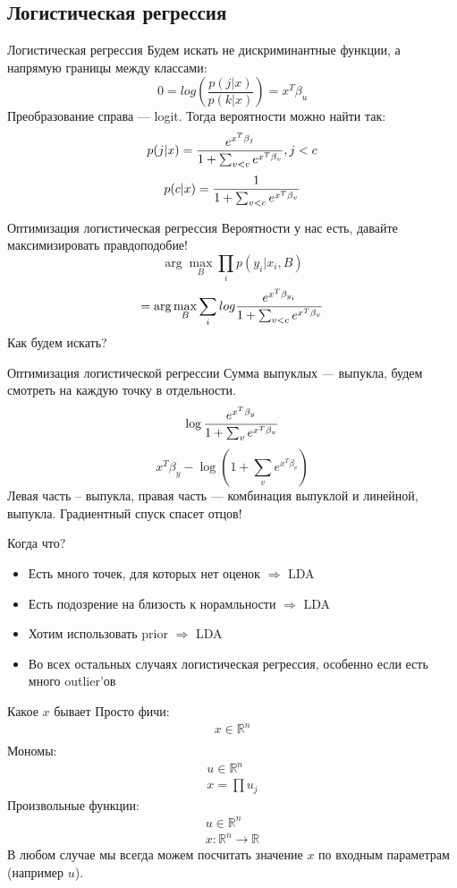 \documentclass[14pt, fleqn, xcolor={dvipsnames, table}]{beamer}
\begin{document}
\subsection{Логистическая регрессия}

\begin{frame}{Логистическая регрессия}
Будем искать не дискриминантные функции, а напрямую границы между классами:
$$
0 = log\left(\frac{p(j|x)}{p(k|x)}\right) = x^T \beta_{u}
$$
Преобразование справа --- logit. Тогда вероятности можно найти так:
$$
p(j|x) = {e^{x^T \beta_{j}} \over 1 + \sum_{v < c} e^{x^T\beta_v}}, j < c
$$
$$
p(c|x) = {1 \over 1 + \sum_{v < c} e^{x^T\beta_v}}
$$
\end{frame}

\begin{frame}{Оптимизация логистическая регрессия}
Вероятности у нас есть, давайте максимизировать правдоподобие!
$$
\arg \max_B \prod_i p(y_i|x_i, B)
$$
$$
= \arg \max_B \sum_i log {e^{x^T \beta_{y_i}} \over 1 + \sum_{v < c} e^{x^T\beta_v}}
$$
Как будем искать?
\end{frame}

\begin{frame}{Оптимизация логистической регрессии}
Сумма выпуклых --- выпукла, будем смотреть на каждую точку в отдельности.
$$
\log {e^{x^T\beta_y} \over 1 + \sum_{v} e^{x^T\beta_v}}
$$
$$
x^T\beta_y - \log \left(1 + \sum_{v} e^{x^T\beta_v}\right)
$$
Левая часть -- выпукла, правая часть --- комбинация выпуклой и линейной, выпукла. Градиентный спуск спасет отцов!
\end{frame}

\begin{frame}{Когда что?}
\begin{itemize}
  \item Есть много точек, для которых нет оценок $\Rightarrow$ LDA
  \item Есть подозрение на близость к норамльности $\Rightarrow$ LDA
  \item Хотим использовать prior $\Rightarrow$ LDA
  \item Во всех остальных случаях логистическая регрессия, особенно если есть много outlier'ов
\end{itemize}
\end{frame}

\begin{frame}{Какое $x$ бывает}
Просто фичи:
$$\begin{array}{l}
x \in \mathbb{R}^n \\
\end{array}$$
Мономы:
$$\begin{array}{l}
u \in \mathbb{R}^n \\
x = \prod u_j
\end{array}$$
Произвольные функции:
$$\begin{array}{l}
u \in \mathbb{R}^n \\
x: \mathbb{R}^n \to \mathbb{R}
\end{array}$$
В любом случае мы всегда можем посчитать значение $x$ по входным параметрам (например $u$).
\end{frame}
\end{document}
